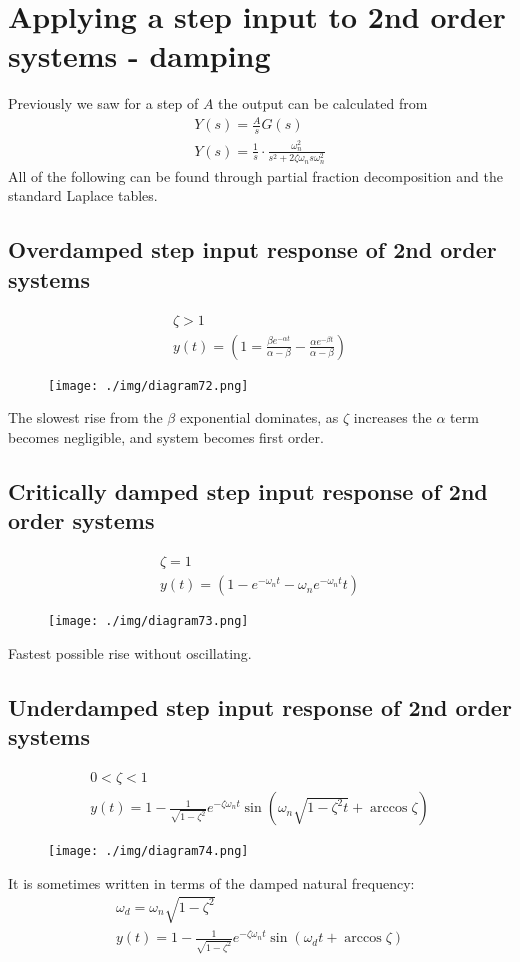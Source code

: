 \section{Applying a step input to 2nd order systems - damping}
Previously we saw for a step of $A$ the output can be calculated from
\begin{gather}
  Y(s) = \frac{A}{s} G(s)\\
  Y(s) = \frac{1}{s} \cdot \frac{\omega_n^2}{s^2 + 2\zeta \omega_n s \omega_n^2}
\end{gather}
All of the following can be found through partial fraction decomposition and the standard Laplace tables.
\subsection{Overdamped step input response of 2nd order systems}
\begin{gather}
  \zeta > 1\\
  y(t) = \left(1 = \frac{\beta e^{-\alpha t}}{\alpha - \beta} - \frac{\alpha e^{-\beta t}}{\alpha - \beta}\right)
\end{gather}
\begin{figure}[H]
  \centering
  \texttt{[image: ./img/diagram72.png]}
\end{figure}
The slowest rise from the $\beta$ exponential dominates, as $\zeta$ increases the $\alpha$ term becomes negligible, and system becomes first order.
\subsection{Critically damped step input response of 2nd order systems}
\begin{gather}
  \zeta = 1\\
  y(t) = \left(1 - e^{-\omega_n t} - \omega_n e ^{-\omega_n t} t\right)
\end{gather}
\begin{figure}[H]
  \centering
  \texttt{[image: ./img/diagram73.png]}
\end{figure}
Fastest possible rise without oscillating.
\subsection{Underdamped step input response of 2nd order systems}
\begin{gather}
  0 < \zeta < 1 \\
  y(t) = 1 - \frac{1}{\sqrt{1 - \zeta^2}}e^{-\zeta \omega_n t} \sin{\left(\omega_n \sqrt{1-\zeta^2 t} + \arccos{\zeta}\right)}
\end{gather}
\begin{figure}[H]
  \centering
  \texttt{[image: ./img/diagram74.png]}
\end{figure}
It is sometimes written in terms of the damped natural frequency:
\begin{gather}
  \omega_d = \omega_n \sqrt{1-\zeta^2}\\
  y(t) = 1 - \frac{1}{\sqrt{1-\zeta^2}} e^{-\zeta \omega_n t} \sin{\left(\omega_d t + \arccos{\zeta}\right)}
\end{gather}
